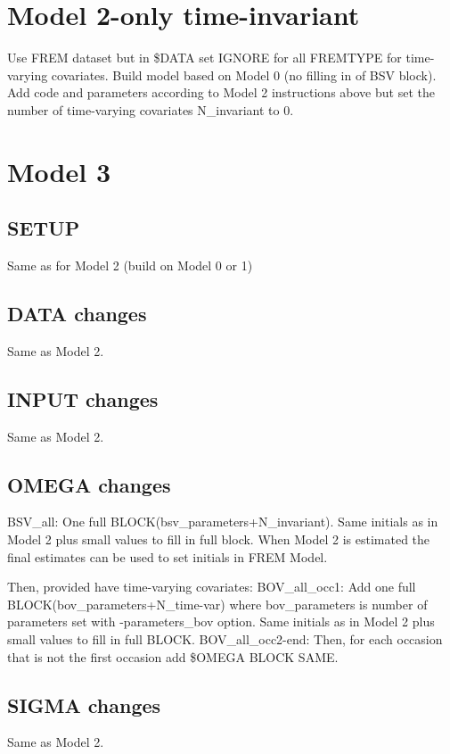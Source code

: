 \section{Model 2-only time-invariant}
Use FREM dataset but in \$DATA set IGNORE for all FREMTYPE for time-varying covariates. Build model based on Model 0 (no filling in of BSV block). Add code and parameters according to Model 2 instructions above but set the number of time-varying covariates N\_invariant to 0.

\section{Model 3}
\subsection{SETUP}
Same as for Model 2 (build on Model 0 or 1)

\subsection{DATA changes}
Same as Model 2.
\subsection{INPUT changes}
Same as Model 2.

\subsection{OMEGA changes}
BSV\_all: One full BLOCK(bsv\_parameters+N\_invariant).
Same initials as in Model 2 plus small values to fill in full block. When Model 2 is estimated
the final estimates can be used to set initials in FREM Model.

Then, provided have time-varying covariates:
BOV\_all\_occ1: Add one full BLOCK(bov\_parameters+N\_time-var) where bov\_parameters is number of parameters set with -parameters\_bov option.
Same initials as in Model 2 plus small values to fill in full BLOCK.
BOV\_all\_occ2-end: Then, for each occasion that is not the first occasion add \$OMEGA BLOCK SAME.

\subsection{SIGMA changes}
Same as Model 2.

